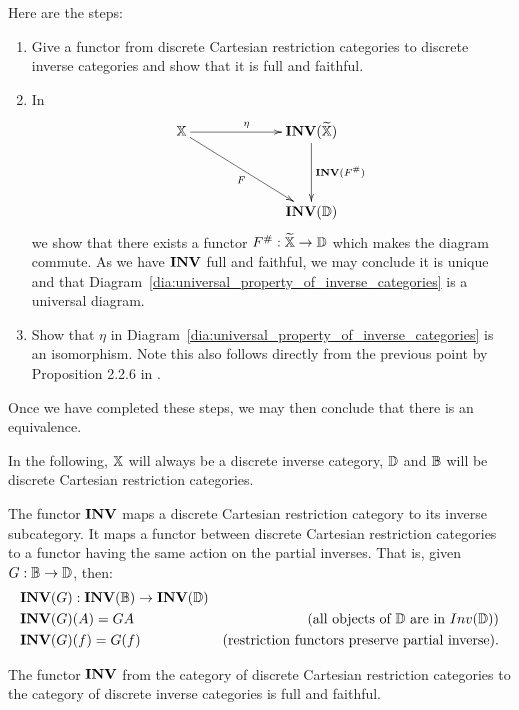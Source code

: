 Here are the steps:
\begin{enumerate}
\item Give a functor \Invf from discrete Cartesian restriction categories to discrete inverse
  categories and show that it is full and faithful.
\item In
  \begin{equation}
    \xymatrix @C=65pt @R=40pt{
      \X \ar[r]^{\eta} \ar[rd]_{F}& \Inv{\Xt} \ar[d]^{\Inv{F^{\#}}}\\
      &\Inv{\D}
    }
    \label{dia:universal_property_of_inverse_categories}
  \end{equation}
  we show that there exists a functor $F^{\#}:\widetilde{\mathbb{X}} \to \mathbb{D}$ which makes the diagram commute. As we
  have $\mathbf{INV}$ full and faithful, we may conclude it is unique and that
  Diagram~\ref{dia:universal_property_of_inverse_categories} is a universal diagram.
\item Show that $\eta$ in Diagram~\ref{dia:universal_property_of_inverse_categories} is an
  isomorphism. Note this also follows directly from the previous point by Proposition 2.2.6 in
  \cite{cockett2009:ctcs}.
\end{enumerate}
Once we have completed these steps, we may then conclude that there is an equivalence.

In the following, $\mathbb{X}$ will always be a discrete inverse category, $\mathbb{D}$ and $\mathbb{B}$ will be discrete
Cartesian restriction categories.

The functor $\mathbf{INV}$ maps a discrete Cartesian restriction category to its inverse subcategory. It
maps a functor between discrete Cartesian restriction categories to a functor having the same action
on the partial inverses. That is, given $G:\mathbb{B} \to \mathbb{D}$, then:
\begin{align*}
  &\mathbf{INV}({G}): \mathbf{INV}({\mathbb{B}}) \to \mathbf{INV}({\mathbb{D}})\\
  &\mathbf{INV}({G})(A) = G{A}&\text{(all objects of $\mathbb{D}$ are in $Inv(\mathbb{D})$)}\\
  &\mathbf{INV}({G})(f) = G(f)&\text{(restriction functors preserve partial inverse)}.
\end{align*}
\begin{lemma}\label{lem:inv_is_full_and_faithful}
  The functor $\mathbf{INV}$ from the category of discrete Cartesian restriction categories to the category
  of discrete inverse categories is full and faithful.
\end{lemma}

